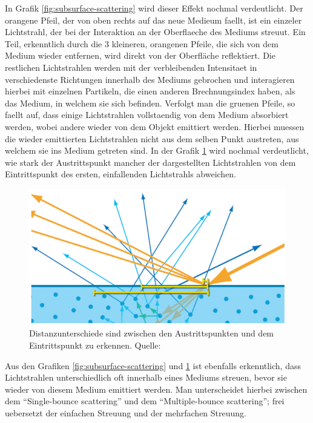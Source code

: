 \documentclass[ngerman,runningheads,a4paper]{llncs}[2018/03/10]
\begin{document}
In Grafik \ref{fig:subsurface-scattering} wird dieser Effekt nochmal verdeutlicht. Der orangene Pfeil, der von oben rechts auf das neue Medieum faellt, ist ein einzeler Lichtstrahl, der bei der Interaktion an der Oberflaeche des Mediums streuut. Ein Teil, erkenntlich durch die 3 kleineren, orangenen Pfeile, die sich von dem Medium wieder entfernen, wird direkt von der Oberfläche reflektiert.
Die restlichen Lichtstrahlen werden mit der verbleibenden Intensitaet in verschiedenste Richtungen innerhalb des Mediums gebrochen und interagieren hierbei mit einzelnen Partikeln, die einen anderen Brechnungsindex haben, als das Medium, in welchem sie sich befinden.
Verfolgt man die gruenen Pfeile, so faellt auf, dass einige Lichtstrahlen vollstaendig von dem Medium absorbiert werden, wobei andere wieder von dem Objekt emittiert werden.
Hierbei muessen die wieder emittierten Lichtstrahlen nicht aus dem selben Punkt austreten, aus welchem sie ins Medium getreten sind. In der Grafik \ref{fig:subsurface-scattering-different-exit-point} wird nochmal verdeutlicht, wie stark der Austrittspunkt mancher der dargestellten Lichtstrahlen von dem Eintrittspunkt des ersten, einfallenden Lichtstrahls abweichen.

\begin{figure}[!h]
  \centering
  \includegraphics[scale=0.3,keepaspectratio]{./images/subsurface-scattering-distance-difference.jpg}
  \caption{Distanzunterschiede sind zwischen den Austrittspunkten und dem Eintrittspunkt zu erkennen. Quelle: \cite{real-time-rendering}}
  \label{fig:subsurface-scattering-different-exit-point}
\end{figure}

Aus den Grafiken \ref{fig:subsurface-scattering} und \ref{fig:subsurface-scattering-different-exit-point} ist ebenfalls erkenntlich, dass Lichtstrahlen unterschiedlich oft innerhalb eines Mediums streuen, bevor sie wieder von diesem Medium emittiert werden.
Man unterscheidet hierbei zwischen dem \enquote{Single-bounce scattering} und dem \enquote{Multiple-bounce scattering}; frei uebersetzt der einfachen Streuung und der mehrfachen Streuung.
\end{document}
